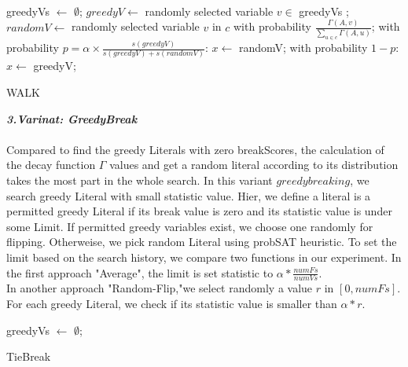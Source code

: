 \documentclass[12pt,a4paper,twoside]{scrartcl}
\numberwithin{equation}{section}
\begin{document}
 \\
\begin{algorithm}[H]
 greedyVs $\leftarrow$ $\emptyset$;\;
  $greedyV \leftarrow$   randomly selected variable $v \in$ greedyVs  ; \;
  $randomV \leftarrow$ randomly selected  variable $v$ in $c$ with probability $\frac{\Gamma(A,v)}{\sum_{u \in c}\Gamma(A,u)}$;  \;
  with probability $p = \alpha \times \frac{s(greedyV)}{s(greedyV)+s(randomV)}$: $x\leftarrow$ randomV;\;
    with probability $1-p$: $x\leftarrow$ greedyV;\;
\caption{WALK}
\end{algorithm} 
 \emph{\textbf{3.Varinat: GreedyBreak}}\\
\\  Compared to find the greedy Literals with zero breakScores, the calculation of the decay function $\Gamma$ values and get a random literal according to its distribution takes the most part in the whole search. In this variant $greedybreaking$, we search greedy Literal with small statistic value.  Hier, we define a literal is a permitted greedy Literal if its break value is zero and its statistic value is under some Limit. If permitted greedy variables exist, we choose one randomly for flipping. Otherweise, we pick random Literal using probSAT heuristic. To set the limit based on the search history, we compare two functions in our experiment. In the first approach "Average", the limit is set statistic to $\alpha*\frac{numFs}{numVs}$.\\
 In another approach "Random-Flip,"we select randomly a value $r $ in $[0, numFs]$. For each greedy Literal, we check if its statistic value is smaller than $\alpha * r$. \\
\begin{algorithm}[H]
  greedyVs $\leftarrow$ $\emptyset$;\;
  \;
\caption{TieBreak}
\end{algorithm} 
\end{document}
